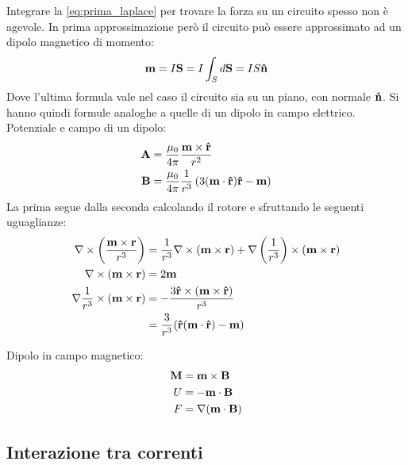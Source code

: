 Integrare la \ref{eq:prima_laplace} per trovare la forza su un circuito spesso non è agevole. In prima approssimazione però il circuito può essere approssimato ad un dipolo magnetico di momento:
\begin{equation}
    \mathbf m = I \mathbf S = I \int_S d \mathbf S = IS \mathbf{\hat n }
\end{equation}
Dove l'ultima formula vale nel caso il circuito sia su un piano, con normale $\mathbf{\hat n }$.
Si hanno quindi formule analoghe a quelle di un dipolo in campo elettrico. 
Potenziale e campo di un dipolo: 
\begin{align}
    \mathbf A &= \frac{ \mu_0  }{ 4\pi } \frac{ \mathbf m \times \mathbf{\hat r } }{ r^2 } \\
    \mathbf B &= \frac{ \mu_0  }{ 4\pi } \frac{ 1 }{ r^3 } \left ( 3(\mathbf m \cdot \mathbf{\hat r } )  \mathbf{\hat r } - \mathbf m \right )
\end{align}
La prima segue dalla seconda calcolando il rotore e sfruttando le seguenti uguaglianze:
\begin{align}
    \nabla \times \left ( \frac{ \mathbf m \times \mathbf r }{ r^3 }  \right ) 
        &= \frac{ 1 }{ r^3 } \nabla \times (\mathbf m \times \mathbf r) + \nabla \left ( \frac{ 1 }{ r^3 } \right ) \times (\mathbf m \times \mathbf r) \\
    \nabla \times (\mathbf m \times \mathbf r) &= 2 \mathbf m \\
    \nabla \frac{ 1 }{ r^3 } \times (\mathbf m \times \mathbf r)   &= - \frac{ 3 \mathbf{\hat r } \times (\mathbf m \times \mathbf{\hat r }) }{ r^3 } \\
                                                            &=  \frac{ 3 }{ r^3 } (\mathbf{\hat r } ( \mathbf m \cdot \mathbf{\hat r }) - \mathbf m)
\end{align}

Dipolo in campo magnetico:
\begin{align}
    \mathbf M &= \mathbf m \times \mathbf B \\
    U &= - \mathbf m \cdot \mathbf B \\
    F &= \nabla(\mathbf m \cdot \mathbf B)
\end{align}


\subsection{Interazione tra correnti} %
\label{sub:interazione_tra_correnti}

